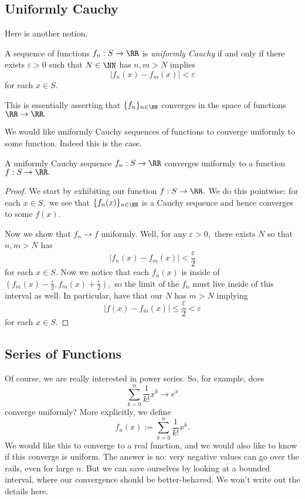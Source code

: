 \subsection{Uniformly Cauchy}
Here is another notion.
\begin{definition}
	A sequence of functions $f_n:S\to\RR$ is \textit{uniformly Cauchy} if and only if there exists $\varepsilon>0$ such that $N\in\NN$ has $n,m>N$ implies
	\[|f_n(x)-f_m(x)|<\varepsilon\]
	for each $x\in S.$
\end{definition}
\begin{remark}
	This is essentially asserting that $\{f_n\}_{n\in\NN}$ converges in the space of functions $\RR\to\RR.$
\end{remark}
We would like uniformly Cauchy sequences of functions to converge uniformly to some function. Indeed this is the case.
\begin{prop}
	A uniformly Cauchy sequence $f_n:S\to\RR$ converges uniformly to a function $f:S\to\RR.$
\end{prop}
\begin{proof}
	We start by exhibiting our function $f:S\to\RR.$ We do this pointwise: for each $x\in S,$ we see that $\{f_n(x)\}_{n\in\NN}$ is a Cauchy sequence and hence converges to some $f(x).$

	Now we show that $f_n\to f$ uniformly. Well, for any $\varepsilon>0,$ there exists $N$ so that $n,m>N$ has
	\[|f_n(x)-f_m(x)|<\frac\varepsilon2\]
	for each $x\in S.$ Now we notice that each $f_n(x)$ is inside of $\left(f_m(x)-\frac{\varepsilon}{2},f_m(x)+\frac{\varepsilon}{2}\right),$ so the limit of the $f_n$ must live inside of this interval as well. In particular, have that our $N$ has $m>N$ implying
	\[|f(x)-f_m(x)|\le\frac{\varepsilon}{2}<\varepsilon\]
	for each $x\in S.$
\end{proof}

\subsection{Series of Functions}
Of course, we are really interested in power series. So, for example, does
\[\sum_{k=0}^n\frac1{k!}x^k\to e^x\]
converge uniformly? More explicitly, we define
\[f_n(x):=\sum_{k=0}^n\frac1{k!}x^k.\]
We would like this to converge to a real function, and we would also like to know if this converge is uniform. The answer is no: very negative values can go over the rails, even for large $n.$ But we can save ourselves by looking at a bounded interval, where our convergence should be better-behaved. We won't write out the details here.

